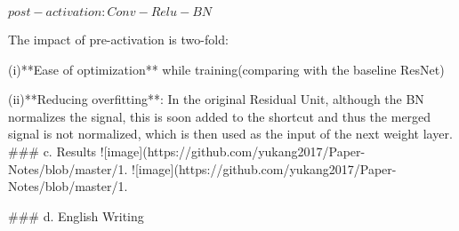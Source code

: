 $post-activation: Conv-Relu-BN$

The impact of pre-activation is two-fold:

(i)**Ease of optimization** while training(comparing with the baseline ResNet)

(ii)**Reducing overfitting**:
In the original Residual Unit, although the BN normalizes the signal, this is soon added to the shortcut and thus the merged signal is not normalized, which is then used as the input of  the next weight layer.
### c. Results
![image](https://github.com/yukang2017/Paper-Notes/blob/master/1.%
![image](https://github.com/yukang2017/Paper-Notes/blob/master/1.%

### d. English Writing
